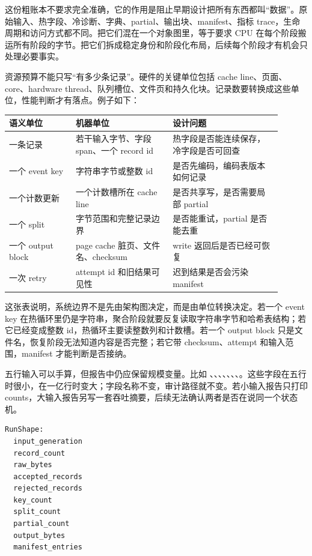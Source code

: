 这份粗账本不要求完全准确，它的作用是阻止早期设计把所有东西都叫“数据”。原始输入、热字段、冷诊断、字典、partial、输出块、manifest、指标 trace，生命周期和访问方式都不同。把它们混在一个对象图里，等于要求 CPU 在每个阶段搬运所有阶段的字节。把它们拆成稳定身份和阶段化布局，后续每个阶段才有机会只处理必要事实。

资源预算不能只写“有多少条记录”。硬件的关键单位包括 cache line、页面、core、hardware thread、队列槽位、文件页和持久化块。记录数要转换成这些单位，性能判断才有落点。例子如下：

\begin{center}
\small
\begin{tabular}{@{}p{0.22\linewidth}p{0.32\linewidth}p{0.36\linewidth}@{}}
\toprule
语义单位 & 机器单位 & 设计问题 \\
\midrule
一条记录 & 若干输入字节、字段 span、一个 record id & 热字段是否能连续保存，冷字段是否可回查 \\
一个 event key & 字符串字节或整数 id & 是否先编码，编码表版本如何记录 \\
一个计数更新 & 一个计数槽所在 cache line & 是否共享写，是否需要局部 partial \\
一个 split & 字节范围和完整记录边界 & 是否能重试，partial 是否能去重 \\
一个 output block & page cache 脏页、文件名、checksum & write 返回后是否已经可恢复 \\
一次 retry & attempt id 和旧结果可见性 & 迟到结果是否会污染 manifest \\
\bottomrule
\end{tabular}
\end{center}

这张表说明，系统边界不是先由架构图决定，而是由单位转换决定。若一个 event key 在热循环里仍是字符串，聚合阶段就要反复读取字符串字节和哈希表结构；若它已经变成整数 id，热循环主要读整数列和计数槽。若一个 output block 只是文件名，恢复阶段无法知道内容是否完整；若它带 checksum、attempt 和输入范围，manifest 才能判断是否接纳。

五行输入可以手算，但报告中仍应保留规模变量。比如 、、、、、、、。这些字段在五行时很小，在一亿行时变大；字段名称不变，审计路径就不变。若小输入报告只打印 counts，大输入报告另写一套吞吐摘要，后续无法确认两者是否在说同一个状态机。

\begin{lstlisting}[numbers=none,caption={最小输入也保留的规模字段}]
RunShape:
  input_generation
  record_count
  raw_bytes
  accepted_records
  rejected_records
  key_count
  split_count
  partial_count
  output_bytes
  manifest_entries
\end{lstlisting}

